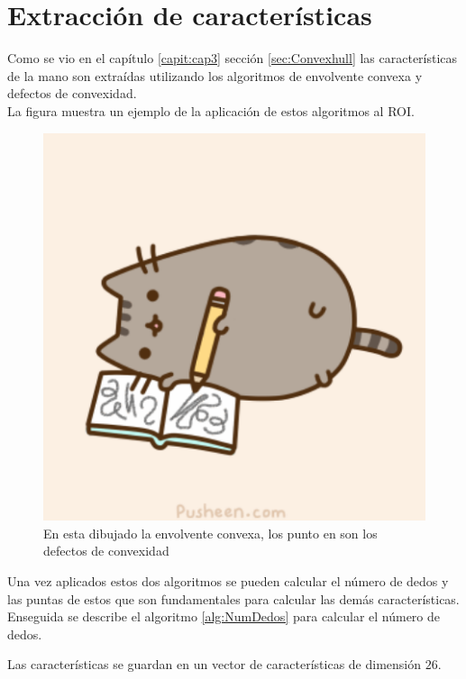\section{Extracción de características}\label{sec:ExtraccionCaracteristicasSystem}

Como se vio en el capítulo \ref{capit:cap3} sección \ref{sec:Convexhull} las características de la mano son extraídas utilizando los algoritmos de envolvente convexa y  defectos de convexidad.\\
La figura muestra un ejemplo de la aplicación de estos algoritmos al ROI.  

\begin{figure}[!h]
\begin{center}
\includegraphics[scale=.5]{./Figures/pusheen.png}
\end{center}
\caption{En esta dibujado la envolvente convexa, los punto en son los defectos de convexidad}
\label{fig:Convex&Defects}
\end{figure}


Una vez aplicados estos dos algoritmos se pueden calcular el número de dedos y las puntas de estos que son fundamentales para calcular las demás características. Enseguida se describe el algoritmo \ref{alg:NumDedos} para calcular el número de dedos. 

Las características se guardan en un vector de características de dimensión $26$.



